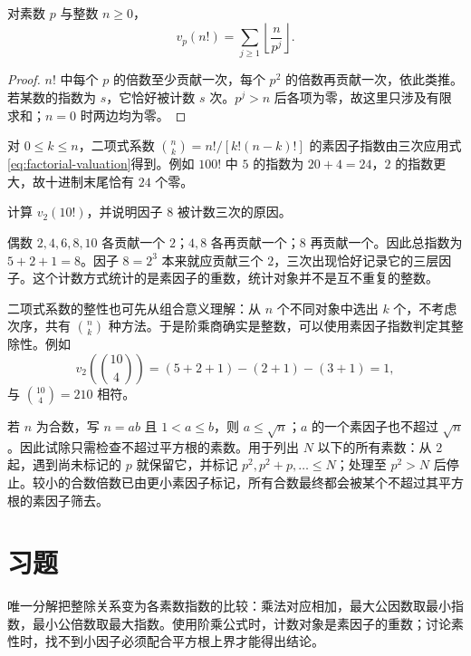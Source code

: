 \documentclass[UTF8,12pt,a4paper,fontset=fandol]{ctexbook}
\begin{document}
\begin{proposition}[阶乘中的素因子指数]
对素数 $p$ 与整数 $n\ge0$，
\begin{equation}
 v_p(n!)=\sum_{j\ge1}\left\lfloor\frac{n}{p^j}\right\rfloor.
 \label{eq:factorial-valuation}
\end{equation}
\end{proposition}
\begin{proof}
$n!$ 中每个 $p$ 的倍数至少贡献一次，每个 $p^2$ 的倍数再贡献一次，依此类推。若某数的指数为 $s$，它恰好被计数 $s$ 次。$p^j>n$ 后各项为零，故这里只涉及有限求和；$n=0$ 时两边均为零。
\end{proof}

对 $0\le k\le n$，二项式系数 $\binom nk=n!/[k!(n-k)!]$ 的素因子指数由三次应用式\eqref{eq:factorial-valuation}得到。例如 $100!$ 中 $5$ 的指数为 $20+4=24$，$2$ 的指数更大，故十进制末尾恰有 $24$ 个零。

\begin{example}[分层计数为何不会重复多算]
计算 $v_2(10!)$，并说明因子 $8$ 被计数三次的原因。
\end{example}
\begin{solve}
偶数 $2,4,6,8,10$ 各贡献一个 $2$；$4,8$ 各再贡献一个；$8$ 再贡献一个。因此总指数为 $5+2+1=8$。因子 $8=2^3$ 本来就应贡献三个 $2$，三次出现恰好记录它的三层因子。这个计数方式统计的是素因子的重数，统计对象并不是互不重复的整数。
\end{solve}

二项式系数的整性也可先从组合意义理解：从 $n$ 个不同对象中选出 $k$ 个，不考虑次序，共有 $\binom nk$ 种方法。于是阶乘商确实是整数，可以使用素因子指数判定其整除性。例如
\[
 v_2\!\left(\binom{10}{4}\right)
 =(5+2+1)-(2+1)-(3+1)=1,
\]
与 $\binom{10}{4}=210$ 相符。

若 $n$ 为合数，写 $n=ab$ 且 $1<a\le b$，则 $a\le\sqrt n$；$a$ 的一个素因子也不超过 $\sqrt n$。因此试除只需检查不超过平方根的素数。用于列出 $N$ 以下的所有素数：从 $2$ 起，遇到尚未标记的 $p$ 就保留它，并标记 $p^2,p^2+p,\ldots\le N$；处理至 $p^2>N$ 后停止。较小的合数倍数已由更小素因子标记，所有合数最终都会被某个不超过其平方根的素因子筛去。

\section{习题}

唯一分解把整除关系变为各素数指数的比较：乘法对应相加，最大公因数取最小指数，最小公倍数取最大指数。使用阶乘公式时，计数对象是素因子的重数；讨论素性时，找不到小因子必须配合平方根上界才能得出结论。
\end{document}
